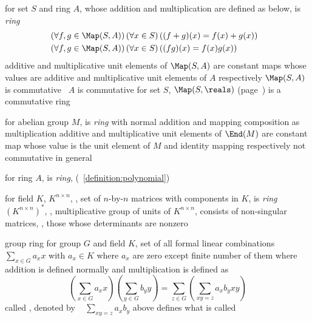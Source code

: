 \documentclass[17pt,landscape]{foils}
\begin{document}
{\bit
\item
	for set $S$ and ring $A$,
	whose addition and multiplication are defined as below,
	is \emph{ring}
	\begin{eqnarray*}
		&
		\left(
			\forall f,g\in \Map(S,A)
		\right)
		\left(
			\forall x\in S
		\right)
		\left(
			(f+g)(x) = f(x)+g(x)
		\right)
		&
		\\
		&
		\left(
			\forall f,g\in \Map(S,A)
		\right)
		\left(
			\forall x\in S
		\right)
		\left(
			(fg)(x) = f(x)g(x)
		\right)
		&
	\end{eqnarray*}
	\bit
	\iitem
		additive and multiplicative unit elements of $\Map(S,A)$
		are constant maps whose values are
		additive and multiplicative unit elements of $A$
		respectively
	\eit
	\bit
	\vitem
		$\Map(S,A)$ is commutative \iaoi\ $A$ is commutative
	\vitem
		for set $S$, $\Map(S,\reals)$
		(page~\pageref{page:Notations})
		is a commutative ring
	\eit

\vitem
	for abelian group $M$,
	is \emph{ring} with normal addition and mapping composition as multiplication
	\bit
	\iitem
		additive and multiplicative unit elements of $\End(M)$
		are constant map whose value is the unit element of $M$
		and identity mapping
		respectively
	\eit
	\bit
	\vitem
		not commutative in general
	\eit

\vitem
	for ring $A$,
	is \emph{ring},
	(~\ref{definition:polynomial})

\vitem
	for field $K$,
	$K^{n\times n}$,
	\ie,
	set of $n$-by-$n$ matrices with components in $K$,
	is \emph{ring}
	\bit
	\vitem
		$\left(K^{n\times n}\right)^\ast$,
		\ie,
		multiplicative group of units of $K^{n\times n}$,
		consists
		of non-singular matrices,
		\ie,
		those whose determinants are nonzero
	\eit
\eit
\vfill



\begin{mydefinition}{group ring}%
	for group $G$ and field $K$,
	set of all formal linear combinations
	$
		\sum_{x\in G} a_x x
	$
	with $a_x\in K$ where $a_x$ are zero except finite number of them
	where addition is defined normally
	and multiplication is defined as
	$$
		\left(
			\sum_{x\in G} a_x x
		\right)
		\left(
			\sum_{y\in G} b_y y
		\right)
		=
		\sum_{z\in G}
		\left(
			\sum_{xy=z} a_xb_y xy
		\right)
	$$
	called ,
	denoted by 
	\shrinkspacewithintheoremslike\
	\ibit
	\iitem
		$\sum_{xy=z} a_xb_y$ above
		defines what is called 
	\eit
\end{mydefinition}


}
\end{document}
